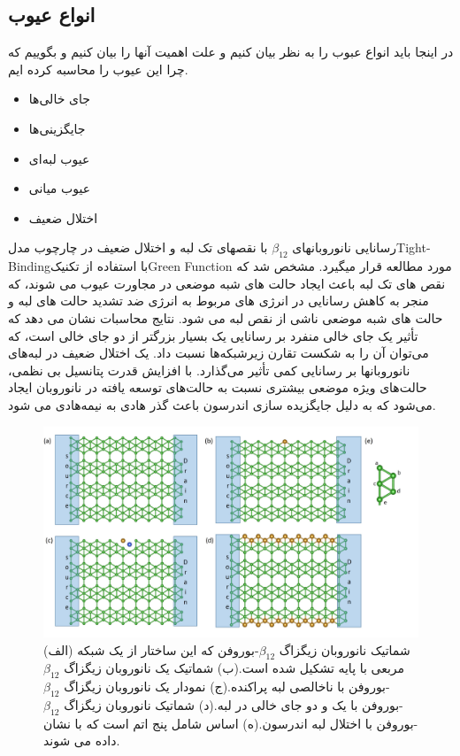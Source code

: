 \subsection{انواع عیوب}
در اینجا باید انواع عبوب را به نظر بیان کنیم و علت اهمیت آنها را بیان کنیم و بگوییم که چرا این عیوب را محاسبه کرده ایم.
\begin{itemize}
  \item جای خالی‌ها
  \item جایگزینی‌ها
  \item عیوب لبه‌ای
  \item عیوب میانی
  \item اختلال ضعیف
\end{itemize}
رسانایی نانوروبانهای $\beta_{12}$  با نقصهای تک لبه و اختلال ضعیف در چارچوب مدل\gls{Tight-Binding}با استفاده از تکنیک\gls{Green Function} مورد مطالعه قرار میگیرد. مشخص شد که نقص های تک لبه باعث ایجاد حالت های شبه موضعی در مجاورت عیوب می شوند، که منجر به کاهش رسانایی در انرژی های مربوط به انرژی ضد تشدید حالت های لبه و حالت های شبه موضعی ناشی از نقص لبه می شود. نتایج محاسبات نشان می دهد که تأثیر یک جای خالی منفرد بر رسانایی یک  بسیار بزرگتر از دو جای خالی است، که می‌توان آن را به شکست تقارن زیرشبکه‌ها نسبت داد. یک اختلال ضعیف در لبه‌های نانوروبانها بر رسانایی کمی تأثیر می‌گذارد. با افزایش قدرت پتانسیل بی نظمی، حالت‌های ویژه موضعی بیشتری نسبت به حالت‌های توسعه یافته در نانوروبان ایجاد می‌شود که به دلیل جایگزیده سازی اندرسون باعث گذر هادی به نیمه‌هادی می شود.
\begin{figure}[!ht]
  \centering
    \includegraphics[width=1\linewidth]{./figures/borophene_structure(3).JPG}
    \caption{(الف) شماتیک نانوروبان زیگزاگ $\beta_{12}$-بوروفن که این ساختار از یک شبکه مربعی با پایه تشکیل شده است.(ب) شماتیک یک نانوروبان زیگزاگ $\beta_{12}$-بوروفن با ناخالصی لبه پراکنده.(ج) نمودار یک نانوروبان زیگزاگ $\beta_{12}$-بوروفن با یک و دو جای خالی در لبه.(د) شماتیک نانوروبان زیگزاگ $\beta_{12}$-بوروفن با اختلال لبه اندرسون.(ه) اساس شامل پنج اتم است که با  نشان داده می شوند.}
   \label{fig:borophene}
\end{figure}
